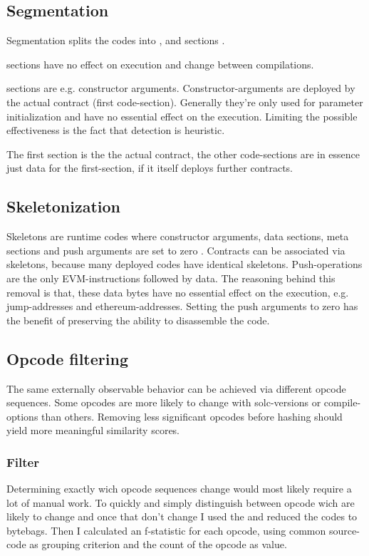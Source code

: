 \documentclass[../main.tex]{subfiles}
\begin{document}
\subsection{Segmentation}
Segmentation splits the codes into ,  and  sections .

 sections have no effect on execution and change between compilations.

 sections are e.g. constructor arguments.
Constructor-arguments are deployed by the actual contract (first code-section).
Generally they're only used for parameter initialization and have no essential effect on the execution.
Limiting the possible effectiveness is the fact that detection is heuristic.

The first  section is the the actual contract, the other code-sections are in essence just data for the first-section, if it itself deploys further contracts.

\subsection{Skeletonization}
Skeletons are runtime codes where constructor arguments, data sections, meta sections and push arguments are set to zero .
Contracts can be associated via skeletons, because many deployed codes have identical skeletons.
Push-operations are the only EVM-instructions followed by data.
The reasoning behind this removal is that, these data bytes have no essential effect on the execution, e.g. jump-addresses and ethereum-addresses.
Setting the push arguments to zero has the benefit of preserving the ability to disassemble the code.

\subsection{Opcode filtering}
The same externally observable behavior can be achieved via different opcode sequences.
Some opcodes are more likely to change with solc-versions or compile-options than others.
Removing less significant opcodes before hashing should yield more meaningful similarity scores.

\subsubsection{ Filter \cite{ethereum-contract-similarity}}
Determining exactly wich opcode sequences change would most likely require a lot of manual work.
To quickly and simply distinguish between opcode wich are likely to change and once that don't change I used the  and reduced the codes to bytebags. Then I calculated an f-statistic  for each opcode, using common source-code as grouping criterion and the count of the opcode as value.
\end{document}
